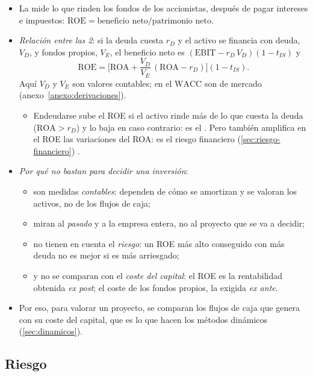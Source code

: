 \documentclass[11pt]{article}
\begin{document}
\begin{itemize}
\item La  mide lo que rinden los fondos de los accionistas, después de pagar intereses e impuestos: $\mathrm{ROE}=\text{beneficio neto}/\text{patrimonio neto}$.
\item \emph{Relación entre las 2}: si la deuda cuesta $r_D$ y el activo se financia con deuda, $V_D$, y fondos propios, $V_E$, el beneficio neto es $(\mathrm{EBIT}-r_D\,V_D)(1-t_{IS})$ y
  \begin{equation}\label{eq:roe-roa}
  \mathrm{ROE}=\Big[\mathrm{ROA}+\frac{V_D}{V_E}\,(\mathrm{ROA}-r_D)\Big](1-t_{IS}).
  \end{equation}
  Aquí $V_D$ y $V_E$ son valores contables; en el $\mathrm{WACC}$ son de mercado (anexo~\ref{anexo:derivaciones}).
  \begin{itemize}
  \item Endeudarse sube el ROE si el activo rinde más de lo que cuesta la deuda ($\mathrm{ROA}>r_D$) y lo baja en caso contrario: es el . Pero también amplifica en el ROE las variaciones del ROA: es el riesgo financiero (\ref{sec:riesgo-financiero}) .
  \end{itemize}
\item \emph{Por qué no bastan para decidir una inversión}:
  \begin{itemize}
  \item son medidas \emph{contables}: dependen de cómo se amortizan y se valoran los activos, no de los flujos de caja;
  \item miran al \emph{pasado} y a la empresa entera, no al proyecto que se va a decidir;
  \item no tienen en cuenta el \emph{riesgo}: un ROE más alto conseguido con más deuda no es mejor si es más arriesgado;
  \item y no se comparan con el \emph{coste del capital}: el ROE es la rentabilidad obtenida \emph{ex post}; el coste de los fondos propios, la exigida \emph{ex ante}.
  \end{itemize}
\item Por eso, para valorar un proyecto, se comparan los flujos de caja que genera con su coste del capital, que es lo que hacen los métodos dinámicos (\ref{sec:dinamicos}).
\end{itemize}

\subsection{Riesgo}\label{sec:riesgo}
\end{document}
